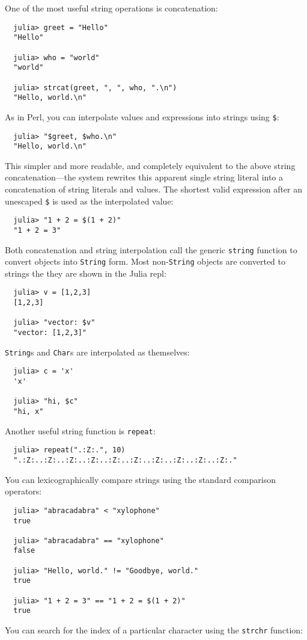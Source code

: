 \documentclass{article}
\begin{document}
One of the most useful string operations is concatenation:
\begin{verbatim}
  julia> greet = "Hello"
  "Hello"

  julia> who = "world"
  "world"

  julia> strcat(greet, ", ", who, ".\n")
  "Hello, world.\n"
\end{verbatim}
As in Perl, you can interpolate values and expressions into strings using \verb|$|:
\begin{verbatim}
  julia> "$greet, $who.\n"
  "Hello, world.\n"
\end{verbatim}
This simpler and more readable, and completely equivalent to the above string concatenation---the system rewrites this apparent single string literal into a concatenation of string literals and values.
The shortest valid expression after an unescaped \verb|$| is used as the interpolated value:
\begin{verbatim}
  julia> "1 + 2 = $(1 + 2)"
  "1 + 2 = 3"
\end{verbatim}
Both concatenation and string interpolation call the generic \verb|string| function to convert objects into \verb|String| form.
Most non-\verb|String| objects are converted to strings the they are shown in the Julia repl:
\begin{verbatim}
  julia> v = [1,2,3]
  [1,2,3]

  julia> "vector: $v"
  "vector: [1,2,3]"
\end{verbatim}
\verb|String|s and \verb|Char|s are interpolated as themselves:
\begin{verbatim}
  julia> c = 'x'
  'x'

  julia> "hi, $c"
  "hi, x"
\end{verbatim}
Another useful string function is \verb|repeat|:
\begin{verbatim}
  julia> repeat(".:Z:.", 10)
  ".:Z:..:Z:..:Z:..:Z:..:Z:..:Z:..:Z:..:Z:..:Z:..:Z:."
\end{verbatim}
You can lexicographically compare strings using the standard comparison operators:
\begin{verbatim}
  julia> "abracadabra" < "xylophone"
  true

  julia> "abracadabra" == "xylophone"
  false

  julia> "Hello, world." != "Goodbye, world."
  true

  julia> "1 + 2 = 3" == "1 + 2 = $(1 + 2)"
  true
\end{verbatim}
You can search for the index of a particular character using the \verb|strchr| function:
\end{document}

